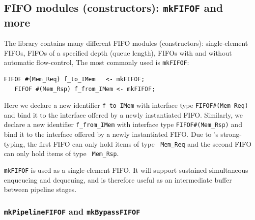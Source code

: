 
\subsection{FIFO modules (constructors): {\tt mkFIFOF} and more}




The {\BSV} library contains many different FIFO modules (constructors):
single-element FIFOs, FIFOs of a specified depth (queue length), FIFOs
with and without automatic flow-control, {\etc} The most commonly used
is {\tt mkFIFOF}:


{\footnotesize
\begin{Verbatim}[frame=single]
   FIFOF #(Mem_Req) f_to_IMem   <- mkFIFOF;
   FIFOF #(Mem_Rsp) f_from_IMem <- mkFIFOF;
\end{Verbatim}
}

Here we declare a new identifier \verb|f_to_IMem| with interface type
\verb|FIFOF#(Mem_Req)| and bind it to the interface offered by a newly
instantiated FIFO.  Similarly, we declare a new identifier
\verb|f_from_IMem| with interface type \verb|FIFOF#(Mem_Rsp)| and bind
it to the interface offered by a newly instantiated FIFO.  Due to
{\BSV}'s strong-typing, the first FIFO can only hold items of type {\tt
Mem\_Req} and the second FIFO can only hold items of type {\tt
Mem\_Rsp}.

{\tt mkFIFOF} is used as a single-element FIFO.  It will support
sustained simultaneous enqueueing and dequeuing, and is therefore
useful as an intermediate buffer between pipeline stages.


\subsubsection{{\tt mkPipelineFIFOF} and {\tt mkBypassFIFOF}}

